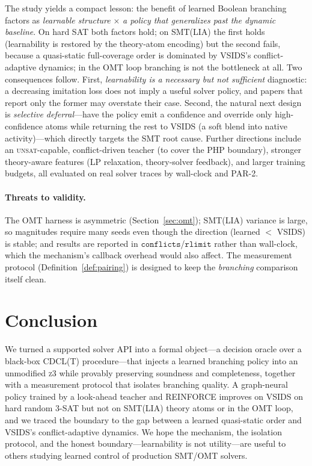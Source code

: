 \documentclass[letterpaper]{article} %
\theoremstyle{definition}
\theoremstyle{plain}
\theoremstyle{remark}
\newcommand{\solver}{\textsc{z3}}
\newcommand{\confl}{\texttt{conflicts}}
\newcommand{\rlimit}{\texttt{rlimit}}
\begin{document}
The study yields a compact lesson: the benefit of learned Boolean branching
factors as \emph{learnable structure} $\times$ \emph{a policy that
generalizes past the dynamic baseline}. On hard SAT both factors hold; on
SMT(LIA) the first holds (learnability is restored by the theory-atom
encoding) but the second fails, because a quasi-static full-coverage order is
dominated by VSIDS's conflict-adaptive dynamics; in the OMT loop branching is
not the bottleneck at all. Two consequences follow. First, \emph{learnability
is a necessary but not sufficient} diagnostic: a decreasing imitation loss
does not imply a useful solver policy, and papers that report only the former
may overstate their case. Second, the natural next design is
\emph{selective deferral}---have the policy emit a confidence and override
only high-confidence atoms while returning the rest to VSIDS (a soft blend
into native activity)---which directly targets the SMT root cause. Further
directions include an \textsc{unsat}-capable, conflict-driven teacher (to
cover the PHP boundary), stronger theory-aware features (LP relaxation,
theory-solver feedback), and larger training budgets, all evaluated on real
solver traces by wall-clock and PAR-2.

\paragraph{Threats to validity.}
The OMT harness is asymmetric (Section~\ref{sec:omt}); SMT(LIA) variance is
large, so magnitudes require many seeds even though the direction
(learned $<$ VSIDS) is stable; and results are reported in $\confl$/$\rlimit$
rather than wall-clock, which the mechanism's callback overhead would also
affect. The measurement protocol (Definition~\ref{def:pairing}) is designed
to keep the \emph{branching} comparison itself clean.

\section{Conclusion}

We turned a supported solver API into a formal object---a decision oracle
over a black-box \textsc{CDCL(T)} procedure---that injects a learned
branching policy into an unmodified \solver{} while provably preserving
soundness and completeness, together with a measurement protocol that
isolates branching quality. A graph-neural policy trained by a look-ahead
teacher and REINFORCE improves on VSIDS on hard random 3-SAT but not on
SMT(LIA) theory atoms or in the OMT loop, and we traced the boundary to the
gap between a learned quasi-static order and VSIDS's conflict-adaptive
dynamics. We hope the mechanism, the isolation protocol, and the honest
boundary---learnability is not utility---are useful to others studying
learned control of production SMT/OMT solvers.


\end{document}
